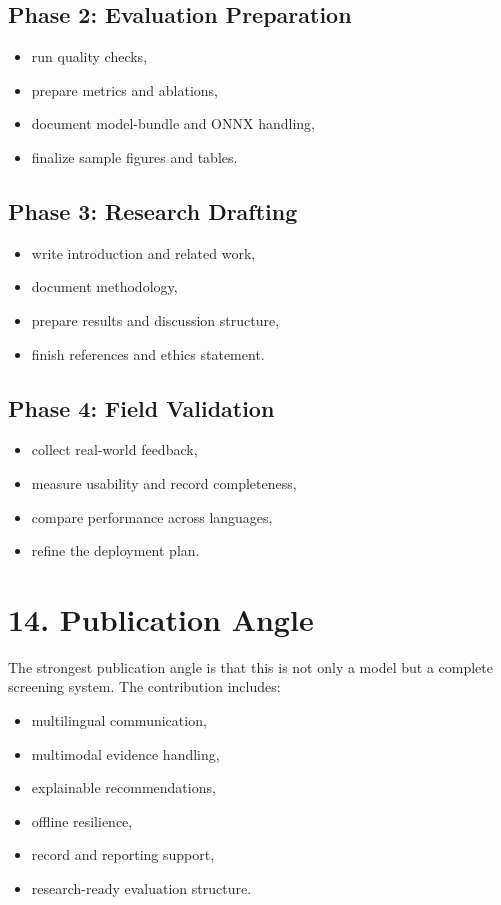 \documentclass[11pt]{article}
\begin{document}
\subsection{Phase 2: Evaluation Preparation}
\begin{itemize}[leftmargin=*]
  \item run quality checks,
  \item prepare metrics and ablations,
  \item document model-bundle and ONNX handling,
  \item finalize sample figures and tables.
\end{itemize}

\subsection{Phase 3: Research Drafting}
\begin{itemize}[leftmargin=*]
  \item write introduction and related work,
  \item document methodology,
  \item prepare results and discussion structure,
  \item finish references and ethics statement.
\end{itemize}

\subsection{Phase 4: Field Validation}
\begin{itemize}[leftmargin=*]
  \item collect real-world feedback,
  \item measure usability and record completeness,
  \item compare performance across languages,
  \item refine the deployment plan.
\end{itemize}

\section{14. Publication Angle}
The strongest publication angle is that this is not only a model but a complete screening system. The contribution includes:
\begin{itemize}[leftmargin=*]
  \item multilingual communication,
  \item multimodal evidence handling,
  \item explainable recommendations,
  \item offline resilience,
  \item record and reporting support,
  \item research-ready evaluation structure.
\end{itemize}
\end{document}
